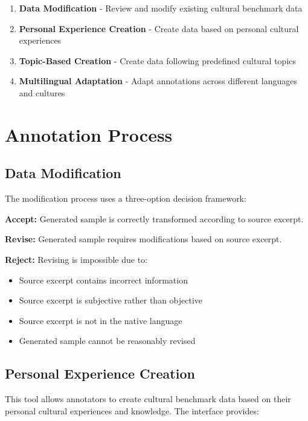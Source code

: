\documentclass[11pt]{article}
\begin{document}
\begin{enumerate}[itemsep=0.3em]
\item \textbf{Data Modification} - Review and modify existing cultural benchmark data
\item \textbf{Personal Experience Creation} - Create data based on personal cultural experiences
\item \textbf{Topic-Based Creation} - Create data following predefined cultural topics
\item \textbf{Multilingual Adaptation} - Adapt annotations across different languages and cultures
\end{enumerate}

\section{Annotation Process}

\subsection{Data Modification}
The modification process uses a three-option decision framework:

\begin{tcolorbox}[colback=blue!5, colframe=blue!80, sharp corners]
\textbf{Accept:} Generated sample is correctly transformed according to source excerpt.

\textbf{Revise:} Generated sample requires modifications based on source excerpt.

\textbf{Reject:} Revising is impossible due to:
\begin{itemize}[itemsep=0.2em]
\item Source excerpt contains incorrect information
\item Source excerpt is subjective rather than objective
\item Source excerpt is not in the native language
\item Generated sample cannot be reasonably revised
\end{itemize}
\end{tcolorbox}

\subsection{Personal Experience Creation}

This tool allows annotators to create cultural benchmark data based on their personal cultural experiences and knowledge. The interface provides:
\end{document}
